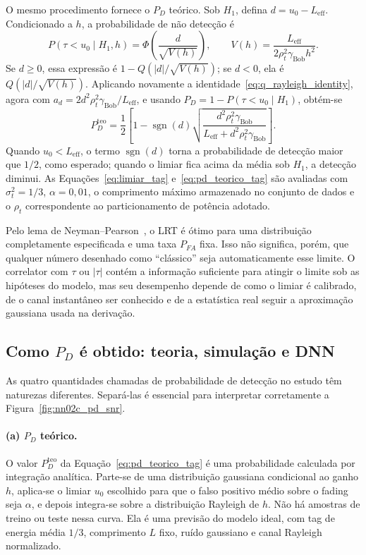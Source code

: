 \documentclass[12pt,a4paper]{article}
\begin{document}
O mesmo procedimento fornece o $P_D$ teórico. Sob $H_1$, defina $d=u_0-L_{\mathrm{eff}}$. Condicionado a $h$, a probabilidade de não detecção é
\begin{equation}
    P(\tau<u_0\mid H_1,h)
    =\Phi\!\left(\frac{d}{\sqrt{V(h)}}\right),
    \qquad
    V(h)=\frac{L_{\mathrm{eff}}}
    {2\rho_t^2\gamma_{\mathrm{Bob}}h^2}.
    \label{eq:miss_cond_h}
\end{equation}
Se $d\geq0$, essa expressão é $1-Q(|d|/\sqrt{V(h)})$; se $d<0$, ela é $Q(|d|/\sqrt{V(h)})$. Aplicando novamente a identidade~\eqref{eq:q_rayleigh_identity}, agora com $a_d=2d^2\rho_t^2\gamma_{\mathrm{Bob}}/L_{\mathrm{eff}}$, e usando $P_D=1-P(\tau<u_0\mid H_1)$, obtém-se
\begin{equation}
 P_D^{\mathrm{teo}}=\frac{1}{2}\left[1-\operatorname{sgn}(d)
 \sqrt{\frac{d^2\rho_t^2\gamma_{\mathrm{Bob}}}
 {L_{\mathrm{eff}}+d^2\rho_t^2\gamma_{\mathrm{Bob}}}}\right].
 \label{eq:pd_teorico_tag}
\end{equation}
Quando $u_0<L_{\mathrm{eff}}$, o termo $\operatorname{sgn}(d)$ torna a probabilidade de detecção maior que $1/2$, como esperado; quando o limiar fica acima da média sob $H_1$, a detecção diminui. As Equações~\eqref{eq:limiar_tag} e~\eqref{eq:pd_teorico_tag} são avaliadas com $\sigma_t^2=1/3$, $\alpha=0{,}01$, o comprimento máximo armazenado no conjunto de dados e o $\rho_t$ correspondente ao particionamento de potência adotado.

Pelo lema de Neyman--Pearson~\cite{ref_poor}, o LRT é ótimo para uma distribuição completamente especificada e uma taxa $P_{FA}$ fixa. Isso não significa, porém, que qualquer número desenhado como ``clássico'' seja automaticamente esse limite. O correlator com $\tau$ ou $|\tau|$ contém a informação suficiente para atingir o limite sob as hipóteses do modelo, mas seu desempenho depende de como o limiar é calibrado, de o canal instantâneo ser conhecido e de a estatística real seguir a aproximação gaussiana usada na derivação.

\subsection{Como $P_D$ é obtido: teoria, simulação e DNN}\label{sec:pd_comparison}

As quatro quantidades chamadas de probabilidade de detecção no estudo têm naturezas diferentes. Separá-las é essencial para interpretar corretamente a Figura~\ref{fig:nn02c_pd_snr}.

\paragraph{(a) $P_D$ teórico.}
O valor $P_D^{\mathrm{teo}}$ da Equação~\eqref{eq:pd_teorico_tag} é uma probabilidade calculada por integração analítica. Parte-se de uma distribuição gaussiana condicional ao ganho $h$, aplica-se o limiar $u_0$ escolhido para que o falso positivo médio sobre o fading seja $\alpha$, e depois integra-se sobre a distribuição Rayleigh de $h$. Não há amostras de treino ou teste nessa curva. Ela é uma previsão do modelo ideal, com tag de energia média $1/3$, comprimento $L$ fixo, ruído gaussiano e canal Rayleigh normalizado.
\end{document}
